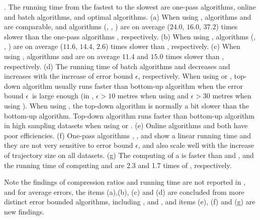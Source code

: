 {\emph{}. The running time from the fastest to the slowest are one-pass algorithms, online and batch algorithms, and optimal algorithms.
(a) When using \ped, algorithms \siped and \operb are comparable, and algorithms
(\tpa, \dpa, \bqsa) are on average ($24.0$, $16.0$, $37.2$) times slower than the one-pass algorithms \siped, respectively.
(b) When using \sed, algorithms (\tpa, \dpa, \squishe) are on average ($11.6$, $14.4$, $2.6$) times slower than \cised, respectively.
(c) When using \dad, algorithms \tpa and \dpa are on average
$11.4$ and $15.0$ times slower than \ridad, respectively.
(d) The running time of batch algorithms \dpa and \tpa decreases and increases with the increase of error bound $\epsilon$, respectively. When using \ped or \sed, top-down algorithm \dpa usually runs faster than bottom-up algorithm \tpa when the error bound $\epsilon$~is large enough (\eg in \geolife, $\epsilon >10$ metres when using \ped and $\epsilon >30$ metres when using \sed). When using \dad, the top-down algorithm is normally a bit slower than the bottom-up algorithm.
Top-down algorithm runs faster than bottom-up algorithm in high sampling datasets when using \ped or \sed.
(e) Online algorithms \bqsa and \opwa both have poor efficiencies.
(f) One-pass algorithms \operb, \siped, \cised and \ridad show a linear running time and they are not very sensitive to error bound $\epsilon$, and also scale well with the increase of trajectory size on all datasets.
(g) The computing of a \dad is faster than \ped and \sed, and the running time of computing \ped and \sed are 2.3 and 1.7 times of \dad, respectively.

Note the findings of compression ratios and running time are not reported in \cite{Zhang:Evaluation}, and for average errors, the items (a),(b), (c) and (d) are concluded from more distinct error bounded \lsa algorithms, including \opt, \siped and \cised, and items (e), (f) and (g) are new findings.
}

